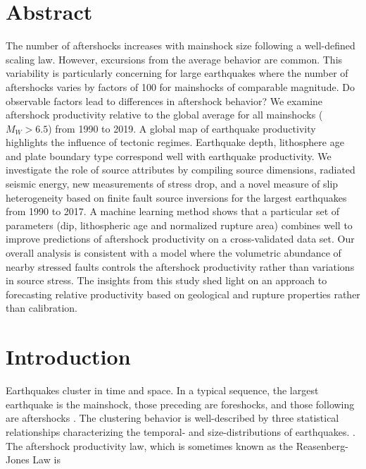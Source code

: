 \documentclass[draft, jgrga]{agujournal2018}
\begin{document}
\newpage

\justify

\section*{Abstract}

 The number of aftershocks increases with mainshock size following a well-defined scaling law. However, excursions from the average behavior are common. This variability is particularly concerning for large earthquakes where the number of aftershocks varies by factors of 100 for mainshocks of comparable magnitude. Do observable factors lead to differences in aftershock behavior? We examine aftershock productivity relative to the global average for all mainshocks ($M_W>6.5$) from 1990 to 2019. A global map of earthquake productivity highlights the influence of tectonic regimes. Earthquake depth, lithosphere age and plate boundary type correspond well with earthquake productivity. We investigate the role of source attributes by compiling source dimensions, radiated seismic energy, new measurements of stress drop, and a novel measure of slip heterogeneity based on finite fault source inversions for the largest earthquakes from 1990 to 2017.  A machine learning method shows that a particular set of parameters (dip, lithospheric age and normalized rupture area) combines well to improve predictions of aftershock productivity on a cross-validated data set. Our overall analysis is consistent with a model where the volumetric abundance of nearby stressed faults controls the aftershock productivity rather than variations in source stress. The insights from this study shed light on an approach to forecasting relative productivity based on geological and rupture properties rather than  calibration.  

\section{Introduction}

Earthquakes cluster in time and space. In a typical sequence, the largest earthquake is the mainshock, those preceding are foreshocks, and those following are aftershocks \citep{Omori1895}. The clustering behavior is well-described by three statistical relationships characterizing the temporal- and size-distributions of earthquakes. \citep[e.g.,][]{Ogata1988}. The aftershock productivity law, which is sometimes known as the Reasenberg-Jones Law is
\end{document}
